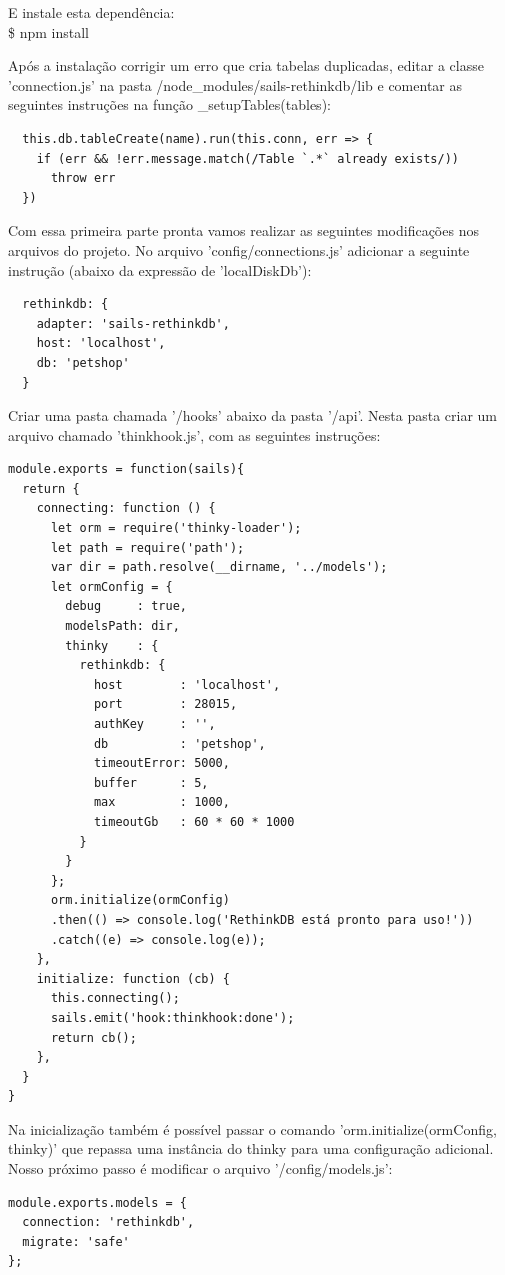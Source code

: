 \documentclass[a4paper,11pt]{article}
\begin{document}
E instale esta dependência: \\
{\ttfamily\$ npm install}

Após a instalação corrigir um erro que cria tabelas duplicadas, editar a classe 'connection.js' na pasta /node\_modules/sails-rethinkdb/lib e comentar as seguintes instruções na função \_setupTables(tables):
\begin{lstlisting}
  this.db.tableCreate(name).run(this.conn, err => {
    if (err && !err.message.match(/Table `.*` already exists/))
      throw err
  })
\end{lstlisting}

Com essa primeira parte pronta vamos realizar as seguintes modificações nos arquivos do projeto. No arquivo 'config/connections.js' adicionar a seguinte instrução (abaixo da expressão de 'localDiskDb'):
\begin{lstlisting}
  rethinkdb: {
    adapter: 'sails-rethinkdb',
    host: 'localhost',
    db: 'petshop'
  }
\end{lstlisting}

Criar uma pasta chamada '/hooks' abaixo da pasta '/api'. Nesta pasta criar um arquivo chamado 'thinkhook.js', com as seguintes instruções:
\begin{lstlisting}
module.exports = function(sails){
  return {
    connecting: function () {
      let orm = require('thinky-loader');
      let path = require('path');
      var dir = path.resolve(__dirname, '../models');
      let ormConfig = {
        debug     : true, 
        modelsPath: dir,
        thinky    : {
          rethinkdb: {
            host        : 'localhost',
            port        : 28015,
            authKey     : '',
            db          : 'petshop',
            timeoutError: 5000,
            buffer      : 5,
            max         : 1000,
            timeoutGb   : 60 * 60 * 1000
          }
        }
      };
      orm.initialize(ormConfig)
      .then(() => console.log('RethinkDB está pronto para uso!'))
      .catch((e) => console.log(e));
    },
    initialize: function (cb) {
      this.connecting();
      sails.emit('hook:thinkhook:done');
      return cb();
    },
  }
}  
\end{lstlisting}

Na inicialização também é possível passar o comando 'orm.initialize(ormConfig, thinky)' que repassa uma instância do thinky para uma configuração adicional. Nosso próximo passo é modificar o arquivo '/config/models.js':
\begin{lstlisting}
module.exports.models = {
  connection: 'rethinkdb',
  migrate: 'safe'
};  
\end{lstlisting}
\end{document}

